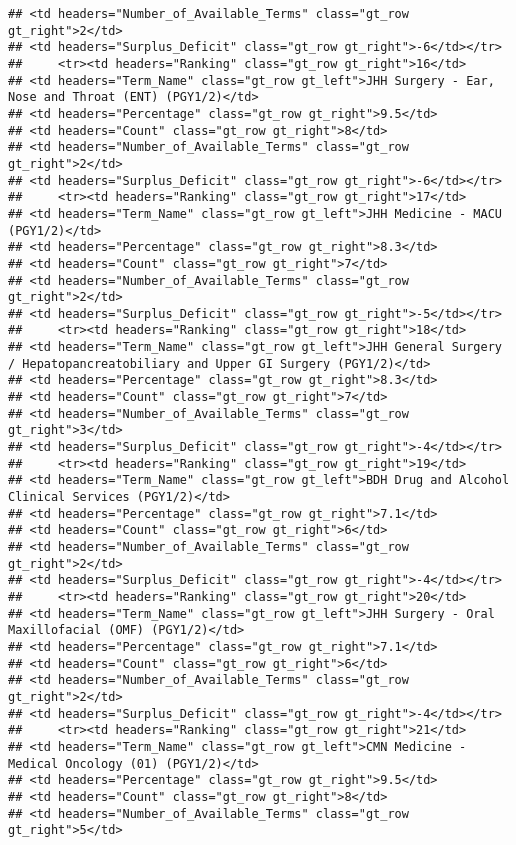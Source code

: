 \documentclass[
]{article}
\begin{document}
\begin{verbatim}
## <td headers="Number_of_Available_Terms" class="gt_row gt_right">2</td>
## <td headers="Surplus_Deficit" class="gt_row gt_right">-6</td></tr>
##     <tr><td headers="Ranking" class="gt_row gt_right">16</td>
## <td headers="Term_Name" class="gt_row gt_left">JHH Surgery - Ear, Nose and Throat (ENT) (PGY1/2)</td>
## <td headers="Percentage" class="gt_row gt_right">9.5</td>
## <td headers="Count" class="gt_row gt_right">8</td>
## <td headers="Number_of_Available_Terms" class="gt_row gt_right">2</td>
## <td headers="Surplus_Deficit" class="gt_row gt_right">-6</td></tr>
##     <tr><td headers="Ranking" class="gt_row gt_right">17</td>
## <td headers="Term_Name" class="gt_row gt_left">JHH Medicine - MACU (PGY1/2)</td>
## <td headers="Percentage" class="gt_row gt_right">8.3</td>
## <td headers="Count" class="gt_row gt_right">7</td>
## <td headers="Number_of_Available_Terms" class="gt_row gt_right">2</td>
## <td headers="Surplus_Deficit" class="gt_row gt_right">-5</td></tr>
##     <tr><td headers="Ranking" class="gt_row gt_right">18</td>
## <td headers="Term_Name" class="gt_row gt_left">JHH General Surgery / Hepatopancreatobiliary and Upper GI Surgery (PGY1/2)</td>
## <td headers="Percentage" class="gt_row gt_right">8.3</td>
## <td headers="Count" class="gt_row gt_right">7</td>
## <td headers="Number_of_Available_Terms" class="gt_row gt_right">3</td>
## <td headers="Surplus_Deficit" class="gt_row gt_right">-4</td></tr>
##     <tr><td headers="Ranking" class="gt_row gt_right">19</td>
## <td headers="Term_Name" class="gt_row gt_left">BDH Drug and Alcohol Clinical Services (PGY1/2)</td>
## <td headers="Percentage" class="gt_row gt_right">7.1</td>
## <td headers="Count" class="gt_row gt_right">6</td>
## <td headers="Number_of_Available_Terms" class="gt_row gt_right">2</td>
## <td headers="Surplus_Deficit" class="gt_row gt_right">-4</td></tr>
##     <tr><td headers="Ranking" class="gt_row gt_right">20</td>
## <td headers="Term_Name" class="gt_row gt_left">JHH Surgery - Oral Maxillofacial (OMF) (PGY1/2)</td>
## <td headers="Percentage" class="gt_row gt_right">7.1</td>
## <td headers="Count" class="gt_row gt_right">6</td>
## <td headers="Number_of_Available_Terms" class="gt_row gt_right">2</td>
## <td headers="Surplus_Deficit" class="gt_row gt_right">-4</td></tr>
##     <tr><td headers="Ranking" class="gt_row gt_right">21</td>
## <td headers="Term_Name" class="gt_row gt_left">CMN Medicine - Medical Oncology (01) (PGY1/2)</td>
## <td headers="Percentage" class="gt_row gt_right">9.5</td>
## <td headers="Count" class="gt_row gt_right">8</td>
## <td headers="Number_of_Available_Terms" class="gt_row gt_right">5</td>

\end{verbatim}
\end{document}
